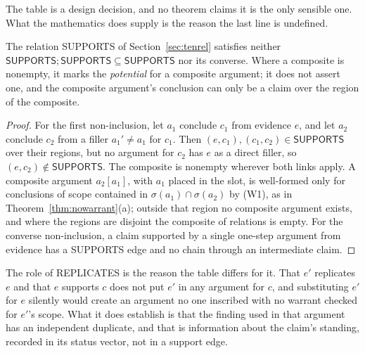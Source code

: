 The table is a design decision, and no theorem claims it is the only sensible one. What the mathematics does supply is the reason the last line is undefined.

\begin{proposition}\label{prop:suppnotrans}
The relation \textsf{SUPPORTS} of Section~\ref{sec:tenrel} satisfies neither $\textsf{SUPPORTS};\textsf{SUPPORTS}\subseteq\textsf{SUPPORTS}$ nor its converse. Where a composite is nonempty, it marks the \emph{potential} for a composite argument; it does not assert one, and the composite argument's conclusion can only be a claim over the region of the composite.
\end{proposition}

\begin{proof}
For the first non-inclusion, let $a_1$ conclude $c_1$ from evidence $e$, and let $a_2$ conclude $c_2$ from a filler $a_1'\ne a_1$ for $c_1$. Then $(e,c_1),(c_1,c_2)\in\textsf{SUPPORTS}$ over their regions, but no argument for $c_2$ has $e$ as a direct filler, so $(e,c_2)\notin\textsf{SUPPORTS}$. The composite is nonempty wherever both links apply. A composite argument $a_2[a_1]$, with $a_1$ placed in the slot, is well-formed only for conclusions of scope contained in $\sigma(a_1)\cap\sigma(a_2)$ by (W1), as in Theorem~\ref{thm:nowarrant}(a); outside that region no composite argument exists, and where the regions are disjoint the composite of relations is empty. For the converse non-inclusion, a claim supported by a single one-step argument from evidence has a \textsf{SUPPORTS} edge and no chain through an intermediate claim.
\end{proof}

The role of \textsf{REPLICATES} is the reason the table differs for it. That $e'$ replicates $e$ and that $e$ supports $c$ does not put $e'$ in any argument for $c$, and substituting $e'$ for $e$ silently would create an argument no one inscribed with no warrant checked for $e'$'s scope. What it does establish is that the finding used in that argument has an independent duplicate, and that is information about the claim's standing, recorded in its status vector, not in a support edge.

